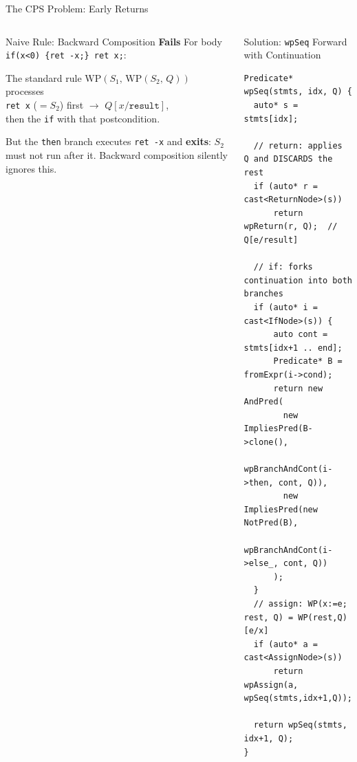 \documentclass[aspectratio=169,11pt]{beamer}
\newcommand{\WP}[2]{\mathrm{WP}(#1,\,#2)}
\begin{document}
\begin{frame}[fragile]{The CPS Problem: Early Returns}

\begin{columns}[t]
  \begin{alertblock}{Naive Rule: Backward Composition \textbf{Fails}}
    \medskip
    For body \;\texttt{if(x<0) \{ret -x;\} ret x;}:

    \medskip
    The standard rule $\WP{S_1}{\WP{S_2}{Q}}$ processes\\
    \texttt{ret x} ($=S_2$) first $\to$ $Q[x/\texttt{result}]$,\\
    then the \texttt{if} with that postcondition.

    \medskip
    But the \texttt{then} branch executes \texttt{ret -x} and \textbf{exits}: $S_2$
    must not run after it.
    Backward composition silently ignores this.
    \medskip
  \end{alertblock}

  \begin{exampleblock}{Solution: \texttt{wpSeq} Forward with Continuation}
\begin{lstlisting}[style=cppslide,basicstyle=\ttfamily\scriptsize]
Predicate* wpSeq(stmts, idx, Q) {
  auto* s = stmts[idx];

  // return: applies Q and DISCARDS the rest
  if (auto* r = cast<ReturnNode>(s))
      return wpReturn(r, Q);  // Q[e/result]

  // if: forks continuation into both branches
  if (auto* i = cast<IfNode>(s)) {
      auto cont = stmts[idx+1 .. end];
      Predicate* B = fromExpr(i->cond);
      return new AndPred(
        new ImpliesPred(B->clone(),
          wpBranchAndCont(i->then, cont, Q)),
        new ImpliesPred(new NotPred(B),
          wpBranchAndCont(i->else_, cont, Q))
      );
  }
  // assign: WP(x:=e; rest, Q) = WP(rest,Q)[e/x]
  if (auto* a = cast<AssignNode>(s))
      return wpAssign(a, wpSeq(stmts,idx+1,Q));

  return wpSeq(stmts, idx+1, Q);
}
\end{lstlisting}
  \end{exampleblock}
\end{columns}
\end{frame}
\end{document}

